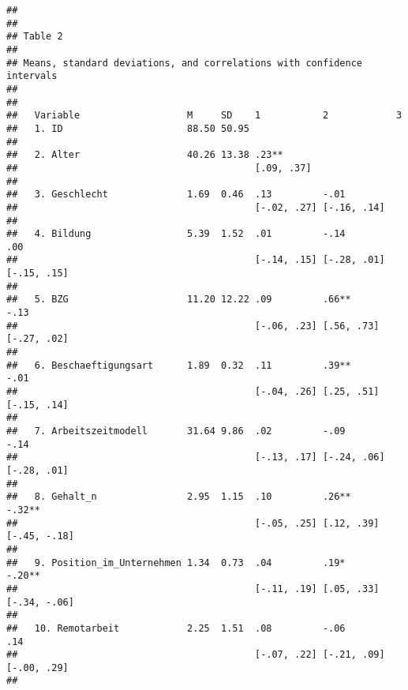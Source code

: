 \documentclass[
]{article}
\begin{document}
\begin{verbatim}
## 
## 
## Table 2 
## 
## Means, standard deviations, and correlations with confidence intervals
##  
## 
##   Variable                   M     SD    1           2            3           
##   1. ID                      88.50 50.95                                      
##                                                                               
##   2. Alter                   40.26 13.38 .23**                                
##                                          [.09, .37]                           
##                                                                               
##   3. Geschlecht              1.69  0.46  .13         -.01                     
##                                          [-.02, .27] [-.16, .14]              
##                                                                               
##   4. Bildung                 5.39  1.52  .01         -.14         .00         
##                                          [-.14, .15] [-.28, .01]  [-.15, .15] 
##                                                                               
##   5. BZG                     11.20 12.22 .09         .66**        -.13        
##                                          [-.06, .23] [.56, .73]   [-.27, .02] 
##                                                                               
##   6. Beschaeftigungsart      1.89  0.32  .11         .39**        -.01        
##                                          [-.04, .26] [.25, .51]   [-.15, .14] 
##                                                                               
##   7. Arbeitszeitmodell       31.64 9.86  .02         -.09         -.14        
##                                          [-.13, .17] [-.24, .06]  [-.28, .01] 
##                                                                               
##   8. Gehalt_n                2.95  1.15  .10         .26**        -.32**      
##                                          [-.05, .25] [.12, .39]   [-.45, -.18]
##                                                                               
##   9. Position_im_Unternehmen 1.34  0.73  .04         .19*         -.20**      
##                                          [-.11, .19] [.05, .33]   [-.34, -.06]
##                                                                               
##   10. Remotarbeit            2.25  1.51  .08         -.06         .14         
##                                          [-.07, .22] [-.21, .09]  [-.00, .29] 
##                                                                               

\end{verbatim}
\end{document}
